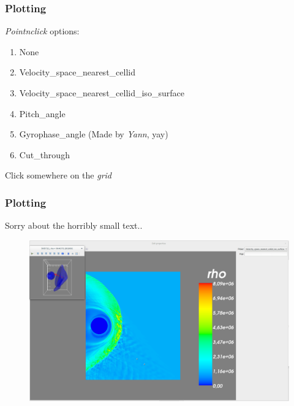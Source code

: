 \documentclass{beamer}
\begin{document}
\begin{frame}[fragile]
 \frametitle{Plotting}
 \begin{center}
 \end{center}
 \emph{Pointnclick} options:
 \begin{enumerate}
  \item None
  \item Velocity\_space\_nearest\_cellid
  \item Velocity\_space\_nearest\_cellid\_iso\_surface
  \item Pitch\_angle
  \item Gyrophase\_angle (Made by \emph{Yann}, yay)
  \item Cut\_through
 \end{enumerate}

 Click  somewhere on the \emph{grid}
\end{frame}

\begin{frame}[fragile]
 \frametitle{Plotting}
 \begin{center}
 \end{center}
 
 \tiny{Sorry about the horribly small text..}
 
 \begin{figure}
  \centering
  \includegraphics[width=\textwidth]{../images/velocity_space_nearest_cellid_iso_surface.png}
  \label{fig:mayavi_example3}
 \end{figure}
\end{frame}
\end{document}
